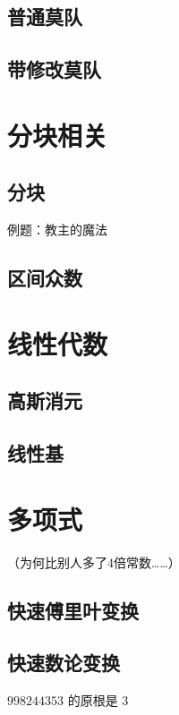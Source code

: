 \documentclass{article}
\begin{document}
		\subsection{普通莫队}
		
		\subsection{带修改莫队}
		
	\newpage

	\section{分块相关}
		\subsection{分块}
		例题：教主的魔法
		
		\subsection{区间众数}
		
	
	\newpage

	\section{线性代数}
		\subsection{高斯消元}
		
		\subsection{线性基}
		

\newpage

	\section{多项式}
		（为何比别人多了4倍常数……）
		\subsection{快速傅里叶变换}
		
		\subsection{快速数论变换}
		$998244353$ 的原根是 $3$
		
\end{document}
